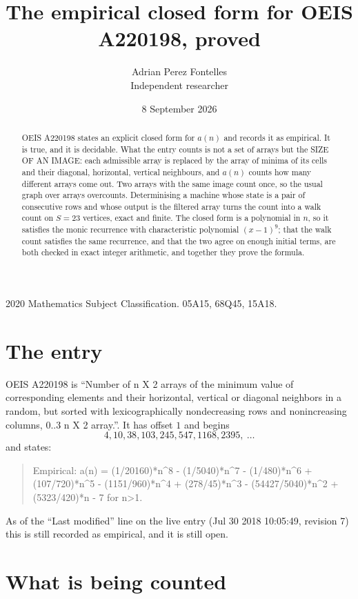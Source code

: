 \documentclass[11pt,a4paper]{article}
\title{The empirical closed form for OEIS A220198, proved}
\author{Adrian Perez Fontelles\\ \small Independent researcher}
\date{8 September 2026}
\theoremstyle{plain}
\theoremstyle{definition}
\begin{document}
\maketitle

\begin{abstract}
OEIS A220198 states an explicit closed form for $a(n)$ and records it as empirical. It is true, and
it is decidable. What the entry counts is not a set of arrays but the SIZE OF AN IMAGE: each
admissible array is replaced by the array of minima of its cells and their diagonal, horizontal, vertical neighbours,
and $a(n)$ counts how many different arrays come out. Two arrays with the same image count
once, so the usual graph over arrays overcounts. Determinising a machine whose state is a pair
of consecutive rows and whose output is the filtered array turns the count into a walk count on
$S=23$ vertices, exact and finite. The closed form is a polynomial in $n$, so it satisfies the
monic recurrence with characteristic polynomial $(x-1)^{9}$; that the walk count
satisfies the same recurrence, and that the two agree on enough initial terms, are both checked
in exact integer arithmetic, and together they prove the formula.
\end{abstract}

\noindent\small 2020 Mathematics Subject Classification. 05A15, 68Q45, 15A18.\normalsize

\section{The entry}

OEIS A220198 is ``Number of n X 2 arrays of the minimum value of corresponding elements and their horizontal, vertical or diagonal neighbors in a random, but sorted with lexicographically nondecreasing rows and nonincreasing columns, 0..3 n X 2 array.''. It has offset $1$ and begins
\[
4, 10, 38, 103, 245, 547, 1168, 2395,\ \dots
\]
and states:
\begin{quote}
Empirical: a(n) = (1/20160)*n\^{}8 - (1/5040)*n\^{}7 - (1/480)*n\^{}6 + (107/720)*n\^{}5 - (1151/960)*n\^{}4 + (278/45)*n\^{}3 - (54427/5040)*n\^{}2 + (5323/420)*n - 7 for n>1.
\end{quote}
As of the ``Last modified'' line on the live entry (Jul 30 2018 10:05:49, revision 7)
this is still recorded as empirical, and it is still open.

\section{What is being counted}
\end{document}

